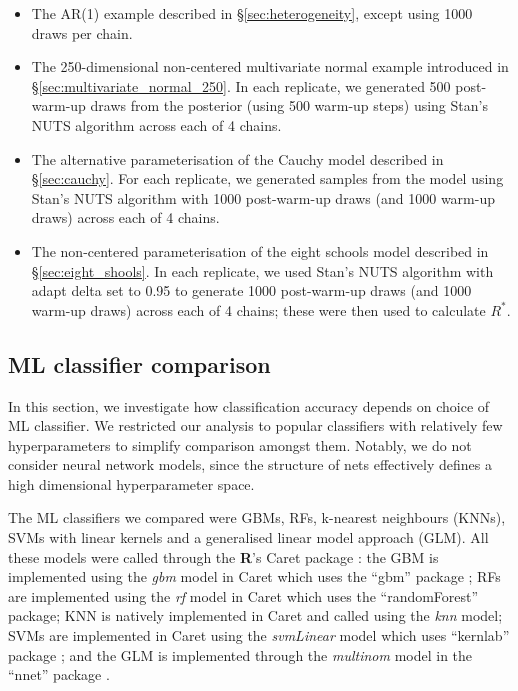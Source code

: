 \documentclass{article}
\begin{document}
\begin{itemize}
	\item The AR(1) example described in \S\ref{sec:heterogeneity}, except using 1000 draws per chain.
	\item The 250-dimensional non-centered multivariate normal example introduced in \S\ref{sec:multivariate_normal_250}. In each replicate, we generated 500 post-warm-up draws from the posterior (using 500 warm-up steps) using Stan's NUTS algorithm across each of 4 chains.
	\item The alternative parameterisation of the Cauchy model described in \S\ref{sec:cauchy}. For each replicate, we generated samples from the model using Stan's NUTS algorithm with 1000 post-warm-up draws (and 1000 warm-up draws) across each of 4 chains.
	\item The non-centered parameterisation of the eight schools model described in \S\ref{sec:eight_shools}. In each replicate, we used Stan's NUTS algorithm with adapt delta set to 0.95 to generate 1000 post-warm-up draws (and 1000 warm-up draws) across each of 4 chains; these were then used to calculate $R^*$.
\end{itemize}

\subsection{ML classifier comparison}\label{sec:ml_model}
In this section, we investigate how classification accuracy depends on choice of ML classifier. We restricted our analysis to popular classifiers with relatively few hyperparameters to simplify comparison amongst them. Notably, we do not consider neural network models, since the structure of nets effectively defines a high dimensional hyperparameter space.

The ML classifiers we compared were GBMs, RFs, k-nearest neighbours (KNNs), SVMs with linear kernels and a generalised linear model approach (GLM). All these models were called through the \textbf{\textsf{R}}'s Caret package \citep{kuhn2008building}: the GBM is implemented using the \textit{gbm} model in Caret which uses the ``gbm'' package \citep{greenwell2019package}; RFs are implemented using the \textit{rf} model in Caret which uses the ``randomForest'' \citep{liaw2002classification} package; KNN is natively implemented in Caret and called using the \textit{knn} model; SVMs are implemented in Caret using the \textit{svmLinear} model which uses ``kernlab'' package \citep{karatzoglou2004kernlab}; and the GLM is implemented through the \textit{multinom} model in the ``nnet'' package \citep{ripley2016package}.
\end{document}
